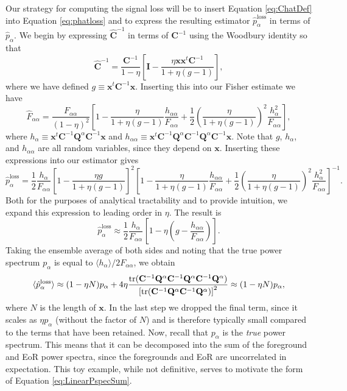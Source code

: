 \documentclass[preprint2,numberedappendix,tighten]{aastex6}  %
\newcommand{\x}{\mathbf{x}}
\newcommand{\C}{\mathbf{C}}
\newcommand{\Chat}{\mathbf{\hat{C}}}
\newcommand{\Q}{\mathbf{Q}}
\newcommand{\I}{\mathbf{I}}
\begin{document}
Our strategy for computing the signal loss will be to insert Equation \eqref{eq:ChatDef} into Equation \eqref{eq:phatloss} and to express the resulting estimator $\hat{p}_\alpha^\textrm{loss}$ in terms of $\hat{p}_\alpha$. We begin by expressing $\Chat^{-1}$ in terms of $\C^{-1}$ using the Woodbury identity so that
\begin{equation}
\Chat^{-1} = \frac{\C^{-1}}{1-\eta} \left[ \I - \frac{\eta \x \x^t \C^{-1}}{1+ \eta (g-1)}\right],
\end{equation}
where we have defined $g \equiv \x^t \C^{-1} \x$. Inserting this into our Fisher estimate we have
\begin{equation}
\hat{F}_{\alpha \alpha} = \frac{F_{\alpha \alpha}}{(1-\eta)^2} \left[ 1 -\frac{\eta }{1+ \eta (g-1)} \frac{h_{\alpha \alpha}}{F_{\alpha \alpha}} + \frac{1}{2} \left( \frac{\eta }{1+ \eta (g-1)} \right)^2 \frac{h_\alpha^2}{F_{\alpha \alpha}}\right],
\end{equation}
where $h_\alpha \equiv \x^t \C^{-1} \Q^\alpha \C^{-1} \x $ and $h_{\alpha \alpha} \equiv \x^t \C^{-1} \Q^\alpha \C^{-1} \Q^\alpha \C^{-1}\x $. Note that $g$, $h_\alpha$, and $h_{\alpha \alpha}$ are all random variables, since they depend on $\x$. Inserting these expressions into our estimator gives
\begin{equation}
\label{eq:phatlossexpanded}
\hat{p}_\alpha^\textrm{loss} = \frac{1}{2} \frac{h_\alpha}{F_{\alpha \alpha}} \left[ 1 - \frac{\eta g}{1+ \eta (g-1)}\right]^2  \left[ 1 -\frac{\eta }{1+ \eta (g-1)} \frac{h_{\alpha \alpha}}{F_{\alpha \alpha}} + \frac{1}{2} \left( \frac{\eta }{1+ \eta (g-1)} \right)^2 \frac{h_\alpha^2}{F_{\alpha \alpha}}\right]^{-1}.
\end{equation}
Both for the purposes of analytical tractability and to provide intuition, we expand this expression to leading order in $\eta$. The result is
\begin{equation}
\hat{p}_\alpha^\textrm{loss} \approx \frac{1}{2} \frac{h_\alpha}{F_{\alpha \alpha}} \left[ 1 - \eta \left( g - \frac{h_{\alpha \alpha}}{F_{\alpha \alpha}}\right)\right].
\end{equation}
Taking the ensemble average of both sides and noting that the true power spectrum $p_\alpha$ is equal to $\langle h_\alpha \rangle / 2 F_{\alpha \alpha}$, we obtain
\begin{equation}
\langle \hat{p}_\alpha^\textrm{loss} \rangle \approx (1- \eta N) p_\alpha + 4 \eta \frac{\rm{tr} (\C^{-1} \Q^\alpha \C^{-1} \Q^\alpha \C^{-1} \Q^\alpha )}{\left[ \rm{tr} (\C^{-1} \Q^\alpha \C^{-1} \Q^\alpha  ) \right]^2} \approx (1- \eta N) p_\alpha,
\end{equation}
where $N$ is the length of $\x$. In the last step we dropped the final term, since it scales as $\eta p_\alpha$ (without the factor of $N$) and is therefore typically small compared to the terms that have been retained. Now, recall that $p_\alpha$ is the \emph{true} power spectrum. This means that it can be decomposed into the sum of the foreground and EoR power spectra, since the foregrounds and EoR are uncorrelated in expectation. This toy example, while not definitive, serves to motivate the form of Equation \eqref{eq:LinearPspecSum}.
\end{document}
